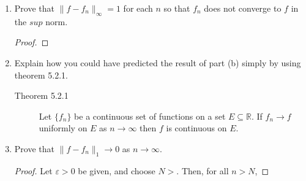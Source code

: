 \documentclass{article}
\begin{document}
\begin{enumerate}
\begin{enumerate}
\begin{proof}
\begin{align*}
                                                              & < \varepsilon.
                              \end{align*}
                              Therefore,
                              \[
                                    \frac{1}{2}< x \leq\frac{1}{2}
                              \]
                              This clearly cannot be true. Contraction!
                              Thus,
                              \begin{align*}
                                    \frac{1}{2} + \frac{1}{n}< & x \leq 1 \\
                                    f_n(x)                     & = 0      \\
                                    f(x)                       & = 0      \\
                                    \therefore f_n(x)          & = f(x)
                              \end{align*}
                              Therefore, $f_n(x)\to f(x)$ pointwise.
                        \end{proof}
                  \item Prove that $\lVert f-f_n\rVert_\infty=1$ for each $n$ so
                        that $f_n$ does not converge to $f$ in the $sup$ norm.
                        \begin{proof}
                        \end{proof}
                  \item Explain how you could have predicted the result of part
                        (b) simply by using theorem 5.2.1.
                        \begin{description}
                              \item[Theorem 5.2.1] Let $\{f_n\}$ be a continuous
                                    set of functions on a set $E\subseteq\mathbb{R}$.
                                    If $f_n\to f$ uniformly on $E$ as $n\to\infty$ then
                                    $f$ is continuous on $E$.
                        \end{description}
                  \item Prove that $\lVert f-f_n\rVert_1\to 0$ as $n\to \infty$.
                        \begin{proof}
                              Let $\varepsilon>0$ be given, and choose $N>$.
                              Then, for all $n>N$, %

\end{proof}
\end{enumerate}
\end{enumerate}
\end{document}
